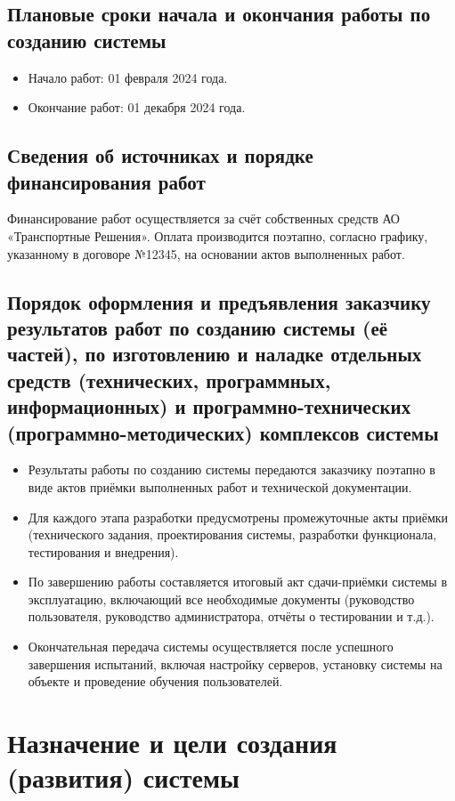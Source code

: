 \subsection{Плановые сроки начала и окончания работы по созданию системы}
\begin{itemize}
    \item Начало работ: 01 февраля 2024 года.
    \item Окончание работ: 01 декабря 2024 года.
\end{itemize}

\subsection{Сведения об источниках и порядке финансирования работ}
Финансирование работ осуществляется за счёт собственных средств АО «Транспортные
Решения». Оплата производится поэтапно, согласно графику, указанному в договоре
№12345, на основании актов выполненных работ.

\subsection{Порядок оформления и предъявления заказчику результатов работ по созданию системы (её частей), по изготовлению и наладке отдельных средств (технических, программных, информационных) и программно-технических (программно-методических) комплексов системы}
\begin{itemize}
    \item Результаты работы по созданию системы передаются заказчику поэтапно в
    виде актов приёмки выполненных работ и технической документации.
    \item Для каждого этапа разработки предусмотрены промежуточные акты приёмки
    (технического задания, проектирования системы, разработки функционала,
    тестирования и внедрения).
    \item По завершению работы составляется итоговый акт сдачи-приёмки системы в
    эксплуатацию, включающий все необходимые документы (руководство пользователя,
    руководство администратора, отчёты о тестировании и т.д.).
    \item Окончательная передача системы осуществляется после успешного завершения
    испытаний, включая настройку серверов, установку системы на объекте и проведение
    обучения пользователей.
\end{itemize}

\section{Назначение и цели создания (развития) системы}

